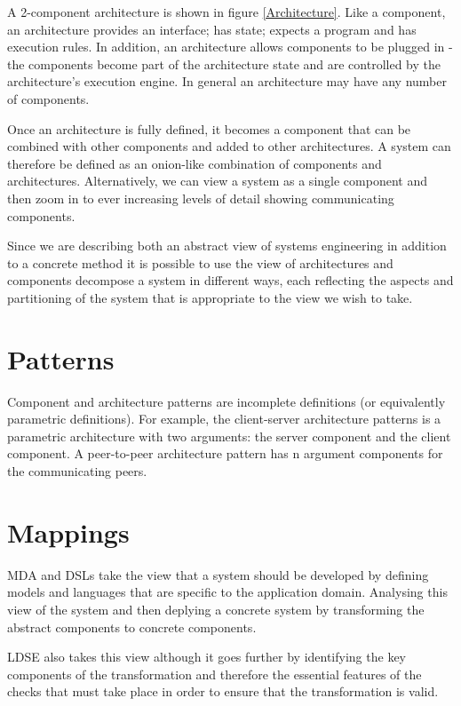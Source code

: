 \documentclass{article}
\begin{document}
A 2-component architecture is shown in figure \ref{Architecture}. Like a component, an architecture
provides an interface; has state; expects a program and has execution rules. In addition,
an architecture allows components to be plugged in - the components become part of the
architecture state and are controlled by the architecture's execution engine. In general an
architecture may have any number of components.

Once an architecture is fully defined, it becomes a component that can be combined with
other components and added to other architectures. A system can therefore be defined as an
onion-like combination of components and architectures. Alternatively, we can view a
system as a single component and then zoom in to ever increasing levels of detail showing 
communicating components.

Since we are describing both an abstract view of systems engineering in addition to a concrete 
method it is possible to use the view of architectures and components decompose a system in
different ways, each reflecting the aspects and partitioning of the system that is appropriate
to the view we wish to take.

\section{Patterns}

Component and architecture patterns are incomplete definitions (or equivalently
parametric definitions). For example, the client-server architecture patterns is a
parametric architecture with two arguments: the server component and the client
component. A peer-to-peer architecture pattern has n argument components for the
communicating peers.

\section{Mappings}

MDA and DSLs take the view that a system should be developed by defining models and
languages that are specific to the application domain. Analysing this view of the system
and then deplying a concrete system by transforming the abstract components to concrete
components.

LDSE also takes this view although it goes further by identifying the key components 
of the transformation and therefore the essential features of the checks that must take place
in order to ensure that the transformation is valid.
\end{document}
